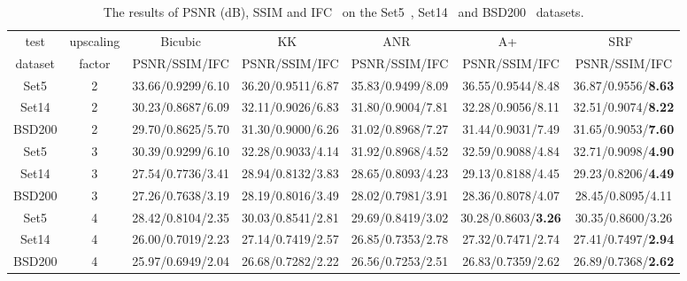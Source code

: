 \documentclass[runningheads]{llncs}
\begin{document}
\begin{table*}[!h]\scriptsize
\caption{The results of PSNR (dB), SSIM and IFC~\cite{sheikh2005information} on the Set5~\cite{Sheikh2005}, Set14~\cite{Zeyde2012} and BSD200~\cite{martin2001database} datasets.}\label{result1}
\begin{center}
\begin{tabular}{|c|c|c|c|c|c|c|}
\hline
 test &  upscaling &  Bicubic &  KK~\cite{Kim2010} &  ANR~\cite{Timofte2013} & A+~\cite{Timofte2013} & SRF~\cite{Schulter2015} \\

 dataset & factor & PSNR/SSIM/IFC &  PSNR/SSIM/IFC &PSNR/SSIM/IFC & PSNR/SSIM/IFC & PSNR/SSIM/IFC\\

\hline\hline
Set5 & 2 & 33.66/0.9299/6.10 &  36.20/0.9511/6.87 & 35.83/0.9499/8.09 & 36.55/0.9544/8.48 & 36.87/0.9556/\textbf{8.63} \\
Set14 & 2 & 30.23/0.8687/6.09  & 32.11/0.9026/6.83 & 31.80/0.9004/7.81 & 32.28/0.9056/8.11 &32.51/0.9074/\textbf{8.22} \\
BSD200 & 2 & 29.70/0.8625/5.70 &  31.30/0.9000/6.26 & 31.02/0.8968/7.27 & 31.44/0.9031/7.49 & 31.65/0.9053/\textbf{7.60}\\
\hline\hline

Set5 & 3 & 30.39/0.9299/6.10  & 32.28/0.9033/4.14 & 31.92/0.8968/4.52 & 32.59/0.9088/4.84 & 32.71/0.9098/\textbf{4.90} \\
Set14 & 3 & 27.54/0.7736/3.41  & 28.94/0.8132/3.83 & 28.65/0.8093/4.23 & 29.13/0.8188/4.45 & 29.23/0.8206/\textbf{4.49} \\
BSD200 & 3 & 27.26/0.7638/3.19  &  28.19/0.8016/3.49 & 28.02/0.7981/3.91 & 28.36/0.8078/4.07 & 28.45/0.8095/4.11 \\
\hline\hline

Set5 & 4 & 28.42/0.8104/2.35  &  30.03/0.8541/2.81 & 29.69/0.8419/3.02 & 30.28/0.8603/\textbf{3.26} & 30.35/0.8600/3.26\\
Set14 & 4 & 26.00/0.7019/2.23 &  27.14/0.7419/2.57 & 26.85/0.7353/2.78 & 27.32/0.7471/2.74 & 27.41/0.7497/\textbf{2.94}\\
BSD200 & 4 & 25.97/0.6949/2.04  & 26.68/0.7282/2.22 & 26.56/0.7253/2.51 & 26.83/0.7359/2.62 & 26.89/0.7368/\textbf{2.62}\\
\hline
\end{tabular}
\end{center}
\end{table*}
\end{document}
